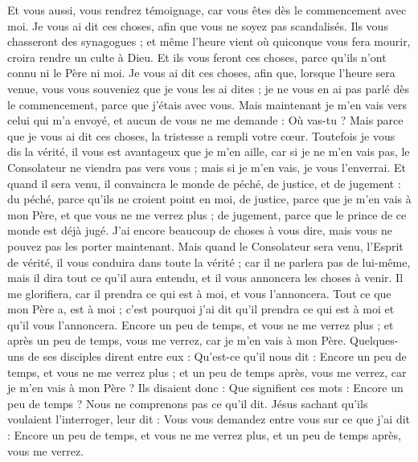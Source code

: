 \begin{multicols}{2}
Et vous aussi, vous rendrez témoignage, car vous êtes dès le commencement avec moi.
\VerseOne{}Je vous ai dit ces choses, afin que vous ne soyez pas scandalisés.
Ils vous chasseront des synagogues ; et même l'heure vient où quiconque vous fera mourir, croira rendre un culte à Dieu.
Et ils vous feront ces choses, parce qu'ils n'ont connu ni le Père ni moi.
Je vous ai dit ces choses, afin que, lorsque l'heure sera venue, vous vous souveniez que je vous les ai dites ; je ne vous en ai pas parlé dès le commencement, parce que j'étais avec vous.
Mais maintenant je m'en vais vers celui qui m'a envoyé, et aucun de vous ne me demande : Où vas-tu ?
Mais parce que je vous ai dit ces choses, la tristesse a rempli votre cœur.
Toutefois je vous dis la vérité, il vous est avantageux que je m'en aille, car si je ne m'en vais pas, le Consolateur ne viendra pas vers vous ; mais si je m'en vais, je vous l'enverrai.
Et quand il sera venu, il convaincra le monde de péché, de justice, et de jugement :
du péché, parce qu'ils ne croient point en moi,
de justice, parce que je m'en vais à mon Père, et que vous ne me verrez plus ;
de jugement, parce que le prince de ce monde est déjà jugé.
J'ai encore beaucoup de choses à vous dire, mais vous ne pouvez pas les porter maintenant.
Mais quand le Consolateur sera venu, l'Esprit de vérité, il vous conduira dans toute la vérité ; car il ne parlera pas de lui-même, mais il dira tout ce qu'il aura entendu, et il vous annoncera les choses à venir.
Il me glorifiera, car il prendra ce qui est à moi, et vous l'annoncera.
Tout ce que mon Père a, est à moi ; c'est pourquoi j'ai dit qu'il prendra ce qui est à moi et qu'il vous l'annoncera.
Encore un peu de temps, et vous ne me verrez plus ; et après un peu de temps, vous me verrez, car je m'en vais à mon Père.
Quelques-uns de ses disciples dirent entre eux : Qu'est-ce qu'il nous dit : Encore un peu de temps, et vous ne me verrez plus ; et un peu de temps après, vous me verrez, car je m'en vais à mon Père ?
Ils disaient donc : Que signifient ces mots : Encore un peu de temps ? Nous ne comprenons pas ce qu'il dit.
Jésus sachant qu'ils voulaient l'interroger, leur dit : Vous vous demandez entre vous sur ce que j'ai dit : Encore un peu de temps, et vous ne me verrez plus, et un peu de temps après, vous me verrez.

\end{multicols}
